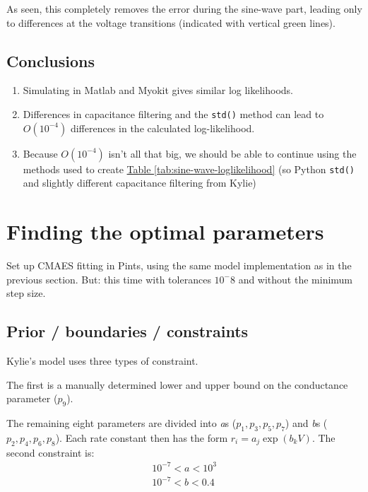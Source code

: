 \documentclass[preprint,authoryear,10pt]{elsarticle}
\newcommand{\tab}[1]{\hyperref[tab:#1]{Table \ref*{tab:#1}}}
\newcommand{\code}[1]{\texttt{#1}}
\begin{document}
As seen, this completely removes the error during the sine-wave part, leading
 only to differences at the voltage transitions (indicated with vertical green
 lines).

\subsection{Conclusions}

\begin{enumerate}
\item Simulating in Matlab and Myokit gives similar log likelihoods.
\item Differences in capacitance filtering and the \code{std()} method can lead
 to $O(10^{-4})$ differences in the calculated log-likelihood.
\item Because $O(10^{-4})$ isn't all that big, we should be able to continue
 using the methods used to create \tab{sine-wave-loglikelihood} (so Python
 \code{std()} and slightly different capacitance filtering from Kylie)
\end{enumerate}










%
%
%
%
\section{Finding the optimal parameters}

Set up CMAES fitting in Pints, using the same model implementation as in the
 previous section.
But: this time with tolerances $10^-8$ and without the minimum step size.

\subsection{Prior / boundaries / constraints}

Kylie's model uses three types of constraint.

The first is a manually determined lower and upper bound on the conductance
 parameter ($p_9$).

The remaining eight parameters are divided into \emph{a}s
 ($p_1, p_3, p_5, p_7$) and \emph{b}s ($p_2, p_4, p_6, p_8$).
Each rate constant then has the form $r_i = a_j \exp(b_k V)$.
The second constraint is:
\begin{align*}
10^{-7} < a < 10^3 \\
10^{-7} < b < 0.4 \\
\end{align*}
\end{document}
